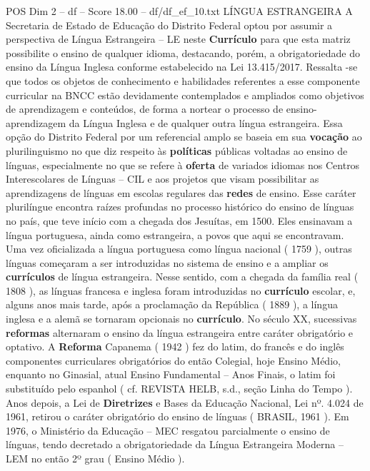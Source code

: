 \begin{textsample}{POS Dim 2 – df – Score 18.00 – df/df\_ef\_10.txt}  \label{ex:f2_pos_128}
LÍNGUA ESTRANGEIRA A Secretaria de Estado de Educação do Distrito Federal optou por assumir a perspectiva de Língua Estrangeira – LE neste \textbf{Currículo} para que esta matriz possibilite o ensino de qualquer idioma, destacando, porém, a obrigatoriedade do ensino da Língua Inglesa conforme estabelecido na Lei 13.415/2017.
Ressalta -se que todos os objetos de conhecimento e habilidades referentes a esse componente curricular na BNCC estão devidamente contemplados e ampliados como objetivos de aprendizagem e conteúdos, de forma a nortear o processo de ensino-aprendizagem da Língua Inglesa e de qualquer outra língua estrangeira.
Essa opção do Distrito Federal por um referencial amplo se baseia em sua \textbf{vocação} ao plurilinguismo no que diz respeito às \textbf{políticas} públicas voltadas ao ensino de línguas, especialmente no que se refere à \textbf{oferta} de variados idiomas nos Centros Interescolares de Línguas – CIL e aos projetos que visam possibilitar as aprendizagens de línguas em escolas regulares das \textbf{redes} de ensino.
Esse caráter plurilíngue encontra raízes profundas no processo histórico do ensino de línguas no país, que teve início com a chegada dos Jesuítas, em 1500.
Eles ensinavam a língua portuguesa, ainda como estrangeira, a povos que aqui se encontravam.
Uma vez oficializada a língua portuguesa como língua nacional ( 1759 ), outras línguas começaram a ser introduzidas no sistema de ensino e a ampliar os \textbf{currículos} de língua estrangeira.
Nesse sentido, com a chegada da família real ( 1808 ), as línguas francesa e inglesa foram introduzidas no \textbf{currículo} escolar, e, alguns anos mais tarde, após a proclamação da República ( 1889 ), a língua inglesa e a alemã se tornaram opcionais no \textbf{currículo}.
No século XX, sucessivas \textbf{reformas} alternaram o ensino da língua estrangeira entre caráter obrigatório e optativo.
A \textbf{Reforma} Capanema ( 1942 ) fez do latim, do francês e do inglês componentes curriculares obrigatórios do então Colegial, hoje Ensino Médio, enquanto no Ginasial, atual Ensino Fundamental – Anos Finais, o latim foi substituído pelo espanhol ( cf.
REVISTA HELB, s.d., seção Linha do Tempo ).
Anos depois, a Lei de \textbf{Diretrizes} e Bases da Educação Nacional, Lei nº. 4.024 de 1961, retirou o caráter obrigatório do ensino de línguas ( BRASIL, 1961 ).
Em 1976, o Ministério da Educação – MEC resgatou parcialmente o ensino de línguas, tendo decretado a obrigatoriedade da Língua Estrangeira Moderna – LEM no então 2º grau ( Ensino Médio ).

\end{textsample}
